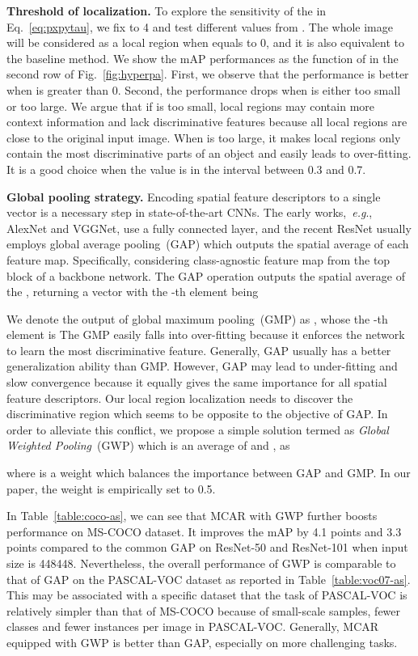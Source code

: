 \documentclass[journal]{IEEEtran}
\makeatletter
\DeclareRobustCommand\onedot{\@onedot}
\def\@onedot{.}
\def\eg{\emph{e.g}\onedot}
\makeatother
\begin{document}
\noindent \textbf{Threshold of localization.} To explore the sensitivity of the  in Eq.~\ref{eq:pxpytau}, we fix  to 4 and test different  values from . The whole image will be considered as a local region when  equals to 0, and it is also equivalent to the  baseline method. We show the mAP performances as the function of  in the second row of Fig.~\ref{fig:hyperpa}.
First, we observe that the performance is better when  is greater than 0. Second, the performance drops when  is either too small or too large. We argue that if  is too small, local regions may contain more context information and lack discriminative features because all local regions are close to the original input image.  When  is too large, it makes local regions only contain the most discriminative parts of an object and easily leads to over-fitting. It is a good choice when the value  is in the interval between 0.3 and 0.7.

\noindent \textbf{Global pooling strategy.}  Encoding spatial feature descriptors to a single vector is a necessary step in state-of-the-art CNNs. The early works,~\eg, AlexNet and VGGNet, use a fully connected layer, and the recent ResNet usually employs global average pooling~(GAP) which outputs the spatial average of each feature map.  Specifically, considering class-agnostic feature map  from the top block of a backbone network. The GAP operation outputs the spatial average of the , returning a vector   with the -th element being
  
We denote the output of global maximum pooling~(GMP) as , whose the -th element is 
 The GMP easily falls into over-fitting because it enforces the network to learn the most discriminative feature. Generally, GAP usually has a better generalization ability than GMP. However, GAP may lead to under-fitting and slow convergence because it equally gives the same importance for all spatial feature descriptors. Our local region localization needs to discover the discriminative region which seems to be opposite to the objective of GAP. In order to alleviate this conflict, we propose a simple solution termed as \emph{Global Weighted Pooling}~(GWP) which is an average of  and , as 
  
where  is a weight which balances the importance between GAP and GMP. In our paper, the weight  is empirically set to 0.5.

In Table~\ref{table:coco-as}, we can see that MCAR with GWP further boosts performance on MS-COCO dataset. It improves the mAP by 4.1 points and 3.3 points compared to the common GAP on ResNet-50 and ResNet-101 when input size is 448448.  Nevertheless, the overall performance of GWP is comparable to that of GAP on the PASCAL-VOC dataset as reported in Table~\ref{table:voc07-as}. This may be associated with a specific dataset that the task of PASCAL-VOC is relatively simpler than that of MS-COCO because of small-scale samples, fewer classes and fewer instances per image in PASCAL-VOC. Generally, MCAR equipped with GWP is better than GAP, especially on more challenging tasks.
\end{document}
